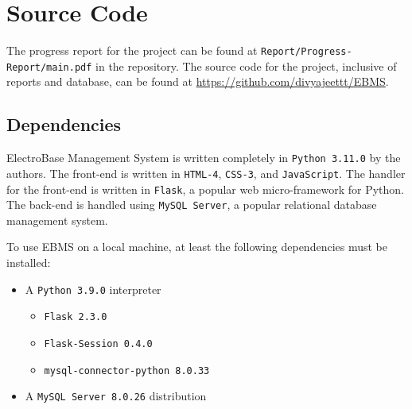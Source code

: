\section{Source Code}

The progress report for the project can be found at \texttt{Report/Progress-Report/main.pdf} in the repository.
The source code for the project, inclusive of reports and database, can be found at \url{https://github.com/divyajeettt/EBMS}.

\subsection*{Dependencies}

ElectroBase Management System is written completely in \texttt{Python 3.11.0} by the authors.
The front-end is written in \texttt{HTML-4}, \texttt{CSS-3}, and \texttt{JavaScript}.
The handler for the front-end is written in \texttt{Flask}, a popular web micro-framework for Python.
The back-end is handled using \texttt{MySQL Server}, a popular relational database management system.

\begin{setupbox}[Dependencies]
    To use EBMS on a local machine, at least the following dependencies must be installed:
    \begin{itemize}
        \item A \texttt{Python 3.9.0} interpreter
        \begin{itemize}
            \item \texttt{Flask 2.3.0}
            \item \texttt{Flask-Session 0.4.0}
            \item \texttt{mysql-connector-python 8.0.33}
        \end{itemize}
        \item A \texttt{MySQL Server 8.0.26} distribution
    \end{itemize}
\end{setupbox}

